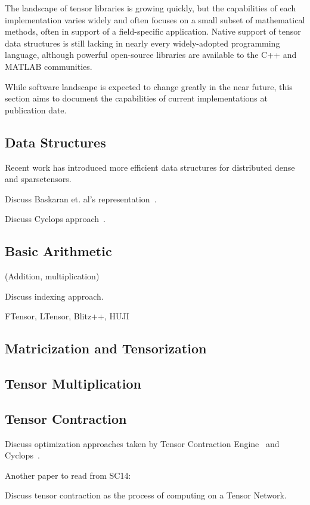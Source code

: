 The landscape of tensor libraries is growing quickly, but the capabilities of each implementation varies widely and often focuses on a small subset of mathematical methods, often in support of a field-specific application. Native support of tensor data structures is still lacking in nearly every widely-adopted programming language, although powerful open-source libraries are available to the C++ and MATLAB communities. 

While software landscape is expected to change greatly in the near future, this section aims to document the capabilities of current implementations at  publication date.

\subsection{Data Structures}
Recent work has introduced more efficient data structures for distributed dense and sparsetensors.

Discuss Baskaran et. al's representation~\cite{6408676}.

Discuss Cyclops approach~\cite{CTF}.

\subsection{Basic Arithmetic}
(Addition, multiplication)

Discuss indexing approach.

FTensor, LTensor, Blitz++, HUJI

\subsection{Matricization and Tensorization}

\subsection{Tensor Multiplication}

\subsection{Tensor Contraction}
Discuss optimization approaches taken by Tensor Contraction Engine~\cite{TCE} and Cyclops~\cite{CTF,Solomonik:EECS-2014-170}.

Another paper to read from SC14:~\cite{Rajbhandari:2014:CFC:2683593.2683635}

Discuss tensor contraction as the process of computing on a Tensor Network.

